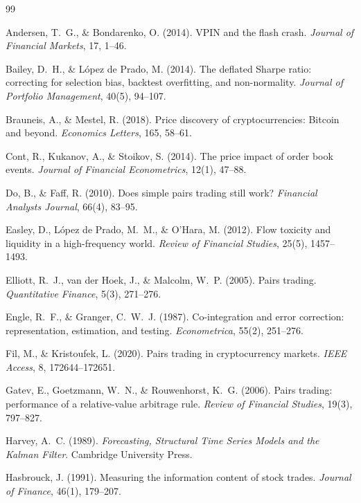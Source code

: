 \documentclass[11pt]{article}
\begin{document}
\begin{thebibliography}{99}

Andersen, T.~G., \& Bondarenko, O. (2014). VPIN and the flash crash.
\emph{Journal of Financial Markets}, 17, 1--46.

Bailey, D.~H., \& L\'opez de Prado, M. (2014). The deflated Sharpe ratio: correcting for
selection bias, backtest overfitting, and non-normality. \emph{Journal of Portfolio
Management}, 40(5), 94--107.

Brauneis, A., \& Mestel, R. (2018). Price discovery of cryptocurrencies: Bitcoin and beyond.
\emph{Economics Letters}, 165, 58--61.

Cont, R., Kukanov, A., \& Stoikov, S. (2014). The price impact of order book events.
\emph{Journal of Financial Econometrics}, 12(1), 47--88.

Do, B., \& Faff, R. (2010). Does simple pairs trading still work?
\emph{Financial Analysts Journal}, 66(4), 83--95.

Easley, D., L\'opez de Prado, M.~M., \& O'Hara, M. (2012). Flow toxicity and liquidity
in a high-frequency world. \emph{Review of Financial Studies}, 25(5), 1457--1493.

Elliott, R.~J., van der Hoek, J., \& Malcolm, W.~P. (2005). Pairs trading.
\emph{Quantitative Finance}, 5(3), 271--276.

Engle, R.~F., \& Granger, C.~W.~J. (1987). Co-integration and error correction:
representation, estimation, and testing. \emph{Econometrica}, 55(2), 251--276.

Fil, M., \& Kristoufek, L. (2020). Pairs trading in cryptocurrency markets.
\emph{IEEE Access}, 8, 172644--172651.

Gatev, E., Goetzmann, W.~N., \& Rouwenhorst, K.~G. (2006). Pairs trading: performance of a
relative-value arbitrage rule. \emph{Review of Financial Studies}, 19(3), 797--827.

Harvey, A.~C. (1989). \emph{Forecasting, Structural Time Series Models and the
Kalman Filter}. Cambridge University Press.

Hasbrouck, J. (1991). Measuring the information content of stock trades.
\emph{Journal of Finance}, 46(1), 179--207.


\end{thebibliography}
\end{document}
